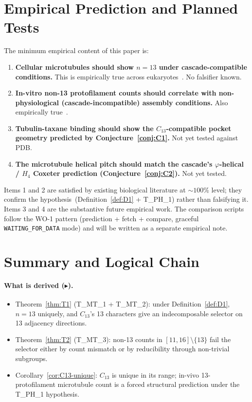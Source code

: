 \documentclass[12pt]{article}
\newcommand{\phig}{\varphi}
\begin{document}
\section{Empirical Prediction and Planned Tests}\label{sec:empirical}

The minimum empirical content of this paper is:

\begin{enumerate}
\item \textbf{Cellular microtubules should show $n = 13$ under
  cascade-compatible conditions.} This is empirically true across
  eukaryotes~\cite{LudueñaReview,TilneyByers}. No falsifier
  known.
\item \textbf{In-vitro non-13 protofilament counts should
  correlate with non-physiological (cascade-incompatible)
  assembly conditions.} Also empirically true~\cite{ChretienWade1991}.
\item \textbf{Tubulin-taxane binding should show the
  $C_{13}$-compatible pocket geometry predicted by
  Conjecture~\ref{conj:C1}.} Not yet tested against PDB.
\item \textbf{The microtubule helical pitch should match the
  cascade's $\phig$-helical / $H_4$ Coxeter prediction
  (Conjecture~\ref{conj:C2}).} Not yet tested.
\end{enumerate}

Items 1 and 2 are satisfied by existing biological literature at
$\sim 100\%$ level; they confirm the
hypothesis~(Definition~\ref{def:D1} + T\_PH\_1) rather than
falsifying it. Items 3 and 4 are the substantive future
empirical work. The comparison scripts follow the WO-1 pattern
(prediction + fetch + compare, graceful
\texttt{WAITING\_FOR\_DATA} mode) and will be written as a
separate empirical note.

\section{Summary and Logical Chain}\label{sec:chain}

\paragraph{What is derived ($\blacktriangleright$).}
\begin{itemize}
\item Theorem~\ref{thm:T1} (T\_MT\_1 + T\_MT\_2): under
  Definition~\ref{def:D1}, $n = 13$ uniquely, and $C_{13}$'s
  13 characters give an indecomposable selector on 13 adjacency
  directions.
\item Theorem~\ref{thm:T2} (T\_MT\_3): non-13 counts in
  $[11, 16] \setminus \{13\}$ fail the selector either by count
  mismatch or by reducibility through non-trivial subgroups.
\item Corollary~\ref{cor:C13-unique}: $C_{13}$ is unique in its
  range; in-vivo 13-protofilament microtubule count is a forced
  structural prediction under the T\_PH\_1 hypothesis.
\end{itemize}
\end{document}
